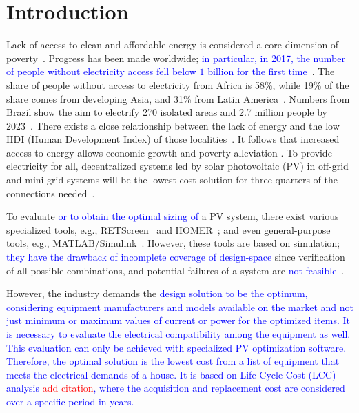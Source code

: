 \documentclass[runningheads]{llncs}
\begin{document}
\section{Introduction}

Lack of access to clean and affordable energy is considered a core dimension of poverty~\cite{Hussein2012}. Progress has been made worldwide; \textcolor{blue}{in particular, in 2017, the number of people without electricity access fell below $1$ billion for the first time}~\cite{IEAweo2018}. The share of people without access to electricity from Africa is 58\%, while 19\% of the share comes from developing Asia, and 31\% from Latin America~\cite{IEAweo2018}. Numbers from Brazil show the aim to electrify 270 isolated areas and 2.7 million people by 2023~\cite{EPE2018}. 
There exists a close relationship between the lack of energy and the low HDI (Human Development Index) of those localities~\cite{Coelho}. It follows that increased access to energy allows economic growth and poverty alleviation \cite{Karekesi}. To provide electricity for all, decentralized systems led by solar photovoltaic (PV) in off-grid and mini-grid systems will be the lowest-cost solution for three-quarters of the connections needed~\cite{Hussein2012}. 

To evaluate \textcolor{blue}{or to obtain the optimal sizing of} a PV system, there exist various specialized tools, e.g., RETScreen~\cite{Pradhan} and HOMER~\cite{Swarnkar}; and even general-purpose tools, e.g., MATLAB/Simulink~\cite{Gow1999}. However, these tools are based on simulation; \textcolor{blue}{they have the drawback of incomplete coverage of design-space} since verification of all possible combinations, and potential failures of a system are \textcolor{blue}{not feasible}~\cite{ClarkeHV18}. 

However, the industry demands the \textcolor{blue}{design solution to be the optimum, considering equipment manufacturers and models available on the market and not just minimum or maximum values of current or power for the optimized items. It is necessary to evaluate the electrical compatibility among the equipment as well. This evaluation can only be achieved with specialized PV optimization software. Therefore, the optimal solution is the lowest cost from a list of equipment that meets the electrical demands of a house. It is based on Life Cycle Cost (LCC) analysis \textcolor{red}{add citation}, where the acquisition and replacement cost are considered over a specific period in years.}
\end{document}
